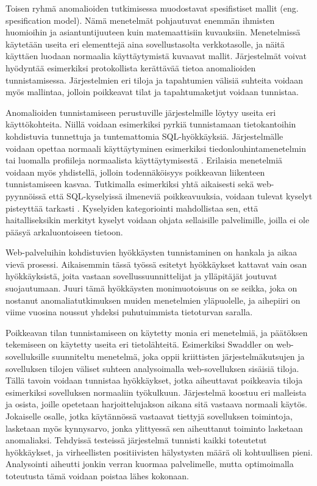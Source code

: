 Toisen ryhmä anomalioiden tutkimisessa muodostavat spesifistiset mallit (eng. spesification model). Nämä menetelmät pohjautuvat enemmän ihmisten huomioihin ja asiantuntijuuteen kuin matemaattisiin
kuvauksiin. Menetelmissä käytetään useita eri elementtejä aina sovellustasolta verkkotasolle, ja näitä käyttäen luodaan normaalia käyttäytymistä kuvaavat mallit. Järjestelmät voivat hyödyntää esimerkiksi
protokollista kerättävää tietoa anomalioiden tunnistamisessa. Järjestelmien eri tiloja ja tapahtumien välisiä suhteita voidaan myös mallintaa, jolloin poikkeavat tilat ja tapahtumaketjut voidaan
tunnistaa. 

Anomalioiden tunnistamiseen perustuville järjestelmille löytyy useita eri käyttökohteita. Niillä voidaan esimerkiksi pyrkiä tunnistamaan tietokantoihin kohdistuvia tunnettuja ja tuntemattomia SQL-hyökkäyksiä.
Järjestelmälle voidaan opettaa normaali käyttäytyminen esimerkiksi tiedonlouhintamenetelmin \cite{Data} tai luomalla profiileja normaalista käyttäytymisestä \cite{SQLanomaly}\cite{SQLlearning}. Erilaisia
menetelmiä voidaan myös yhdistellä, jolloin todennäköisyys poikkeavan liikenteen tunnistamiseen kasvaa. Tutkimalla esimerkiksi yhtä aikaisesti sekä web-pyynnöissä että SQL-kyselyissä ilmeneviä poikkeavuuksia, 
voidaan tulevat kyselyt pisteyttää tarkasti \cite{WebSQL}. Kyselyiden kategoriointi mahdollistaa sen, että haitalliseksikin merkityt kyselyt voidaan ohjata sellaisille palvelimille, joilla ei ole 
pääsyä arkaluontoiseen tietoon. 

Web-palveluihin kohdistuvien hyökkäysten tunnistaminen on hankala ja aikaa vievä prosessi. Aikaisemmin tässä työssä esitetyt hyökkäykset kattavat vain osan hyökkäyksistä, joita vastaan sovellussuunnittelijat ja
ylläpitäjät joutuvat suojautumaan. Juuri tämä hyökkäysten monimuotoisuus on se seikka, joka on nostanut anomaliatutkimuksen muiden menetelmien yläpuolelle, ja aihepiiri on viime vuosina noussut yhdeksi 
puhutuimmista tietoturvan saralla. 

Poikkeavan tilan tunnistamiseen on käytetty monia eri menetelmiä, ja päätöksen tekemiseen on käytetty useita eri tietolähteitä. Esimerkiksi Swaddler \cite{Swaddler} on 
web-sovelluksille suunniteltu menetelmä, joka oppii kriittisten järjestelmäkutsujen ja sovelluksen tilojen väliset suhteen analysoimalla web-sovelluksen sisäisiä tiloja. Tällä tavoin voidaan tunnistaa hyökkäykset,
jotka aiheuttavat poikkeavia tiloja esimerkiksi sovelluksen normaaliin työkulkuun. Järjestelmä koostuu eri malleista ja osista, joille opetetaan harjoittelujakson aikana sitä vastaava normaali käytös. Jokaiselle
osalle, jotka käytännössä vastaavat tiettyjä sovelluksen toimintoja, lasketaan myös kynnysarvo, jonka ylittyessä sen aiheuttanut toiminto lasketaan anomaliaksi. Tehdyissä testeissä järjestelmä tunnisti 
kaikki toteutetut hyökkäykset, ja virheellisten positiivisten hälystysten määrä oli kohtuullisen pieni. Analysointi aiheutti jonkin verran kuormaa palvelimelle, mutta optimoimalla toteutusta tämä voidaan poistaa
lähes kokonaan. 

